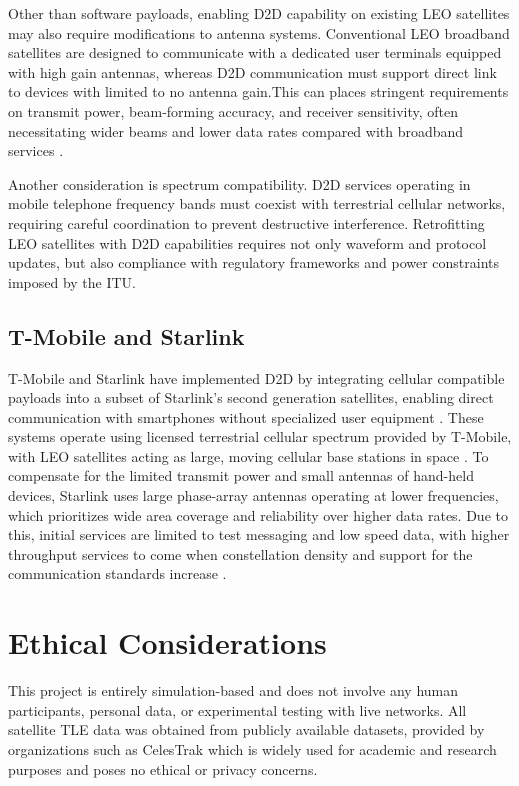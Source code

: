 Other than software payloads, enabling D2D capability on existing LEO satellites may also require modifications to antenna systems. Conventional LEO broadband satellites are designed to communicate with a dedicated user terminals equipped with high gain antennas, whereas D2D communication must support direct link to devices with limited to no antenna gain.This can places stringent requirements on  transmit power, beam-forming accuracy, and receiver sensitivity, often necessitating wider beams and lower data rates compared with broadband services \cite{ITU_R_Space}. 

Another consideration is spectrum compatibility. D2D services operating in mobile telephone frequency bands must coexist with terrestrial cellular networks, requiring careful coordination to prevent destructive interference. Retrofitting LEO satellites with D2D capabilities requires not only waveform and protocol updates, but also compliance with regulatory frameworks and power constraints imposed by the ITU. 

\subsection{T-Mobile and Starlink}
T-Mobile and Starlink have implemented D2D by integrating cellular compatible payloads into a subset of Starlink's second generation satellites, enabling direct communication with smartphones without specialized user equipment \cite{TMobileSpaceXCoverage2022}. These systems operate using licensed terrestrial cellular spectrum provided by T-Mobile, with LEO satellites acting as large, moving cellular base stations in space \cite{TMobileSpaceXCoverage2022}. To compensate for the limited transmit power and small antennas of hand-held devices, Starlink uses large phase-array antennas operating at lower frequencies, which prioritizes wide area coverage and reliability over higher data rates. Due to this, initial services are limited to test messaging and low speed data, with higher throughput services to come when constellation density and support for the communication standards increase \cite{fccstarlink}.


\section{Ethical Considerations}
This project is entirely simulation-based and does not involve any human participants, personal data, or experimental testing with live networks. All satellite TLE data was obtained from publicly available datasets, provided by organizations such as CelesTrak \cite{celestrakTLE} which is widely used for academic and research purposes and poses no ethical or privacy concerns. 

